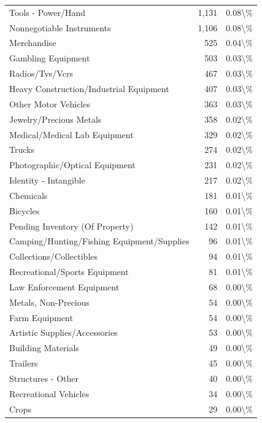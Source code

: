 \documentclass[
  12pt,
  openany]{book}
\begin{document}
\begin{longtable}[t]{lrr}
Tools - Power/Hand & 1,131 & 0.08\textbackslash{}\%\\
Nonnegotiable Instruments & 1,106 & 0.08\textbackslash{}\%\\
\addlinespace
Merchandise & 525 & 0.04\textbackslash{}\%\\
Gambling Equipment & 503 & 0.03\textbackslash{}\%\\
Radios/Tvs/Vcrs & 467 & 0.03\textbackslash{}\%\\
Heavy Construction/Industrial Equipment & 407 & 0.03\textbackslash{}\%\\
Other Motor Vehicles & 363 & 0.03\textbackslash{}\%\\
\addlinespace
Jewelry/Precious Metals & 358 & 0.02\textbackslash{}\%\\
Medical/Medical Lab Equipment & 329 & 0.02\textbackslash{}\%\\
Trucks & 274 & 0.02\textbackslash{}\%\\
Photographic/Optical Equipment & 231 & 0.02\textbackslash{}\%\\
Identity - Intangible & 217 & 0.02\textbackslash{}\%\\
\addlinespace
Chemicals & 181 & 0.01\textbackslash{}\%\\
Bicycles & 160 & 0.01\textbackslash{}\%\\
Pending Inventory (Of Property) & 142 & 0.01\textbackslash{}\%\\
Camping/Hunting/Fishing Equipment/Supplies & 96 & 0.01\textbackslash{}\%\\
Collections/Collectibles & 94 & 0.01\textbackslash{}\%\\
\addlinespace
Recreational/Sports Equipment & 81 & 0.01\textbackslash{}\%\\
Law Enforcement Equipment & 68 & 0.00\textbackslash{}\%\\
Metals, Non-Precious & 54 & 0.00\textbackslash{}\%\\
Farm Equipment & 54 & 0.00\textbackslash{}\%\\
Artistic Supplies/Accessories & 53 & 0.00\textbackslash{}\%\\
\addlinespace
Building Materials & 49 & 0.00\textbackslash{}\%\\
Trailers & 45 & 0.00\textbackslash{}\%\\
Structures - Other & 40 & 0.00\textbackslash{}\%\\
Recreational Vehicles & 34 & 0.00\textbackslash{}\%\\
Crops & 29 & 0.00\textbackslash{}\%\\

\end{longtable}
\end{document}
